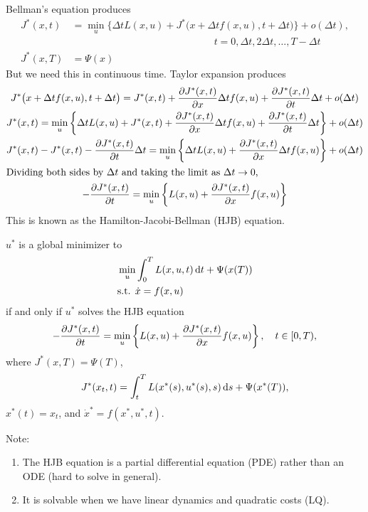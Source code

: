 Bellman's equation produces
\begin{align}
  J^*(x,t) &= \min_u \Big\{ \Delta t L(x,u) + J^*\big(x+\Delta t f(x,u),t+\Delta t\big) \Big\} + o(\Delta t), \\
           & \hspace{6cm} t=0,\Delta t,2\Delta t,\dots,T-\Delta t \\
  J^*(x,T) &= \Psi(x)
\end{align}
But we need this in continuous time. Taylor expansion produces
\begin{gather}
  J^*\big(x+\Delta t f(x,u),t+\Delta t\big) = J^*(x,t) + \frac{\partial J^*(x,t)}{\partial x}\Delta tf(x,u) + \frac{\partial J^*(x,t)}{\partial t}\Delta t + o(\Delta t) \\
  J^*(x,t) = \min_u \left\{ \Delta t L(x,u) + J^*(x,t) + \frac{\partial J^*(x,t)}{\partial x}\Delta tf(x,u) + \frac{\partial J^*(x,t)}{\partial t}\Delta t \right\} + o(\Delta t) \\
  J^*(x,t) - J^*(x,t) - \frac{\partial J^*(x,t)}{\partial t}\Delta t = \min_u \left\{ \Delta t L(x,u) + \frac{\partial J^*(x,t)}{\partial x}\Delta tf(x,u) \right\} + o(\Delta t) \\
  \intertext{Dividing both sides by $\Delta t$ and taking the limit as $\Delta t\to0$,}
  -\frac{\partial J^*(x,t)}{\partial t} = \min_u \left\{ L(x,u) + \frac{\partial J^*(x,t)}{\partial x} f(x,u) \right\}
\end{gather}
This is known as the Hamilton-Jacobi-Bellman (HJB) equation.

\begin{thm}
  $u^*$ is a global minimizer to
  \begin{align}
    & \min_u \int_0^T L(x,u,t)\mathop{}\!\mathrm{d} t + \Psi(x(T)) \\
    & \text{s.t. } \dot x=f(x,u)
  \end{align}
  if and only if $u^*$ solves the HJB equation
  \begin{gather}
    -\frac{\partial J^*(x,t)}{\partial t} = \min_u \left\{ L(x,u) + \frac{\partial J^*(x,t)}{\partial x} f(x,u) \right\}, \quad t\in[0,T),
  \end{gather}
  where $J^*(x,T)=\Psi(T)$,
  \begin{gather}
    J^*(x_t,t) = \int_t^T L(x^*(s),u^*(s),s)\mathop{}\!\mathrm{d} s + \Psi(x^*(T)),
  \end{gather}
  $x^*(t)=x_t$, and $\dot x^*=f(x^*,u^*,t)$.
\end{thm}

Note:
\begin{enumerate}[nosep]
\item The HJB equation is a partial differential equation (PDE) rather than an ODE (hard to solve in general).
\item It is solvable when we have linear dynamics and quadratic costs (LQ).
\end{enumerate}

